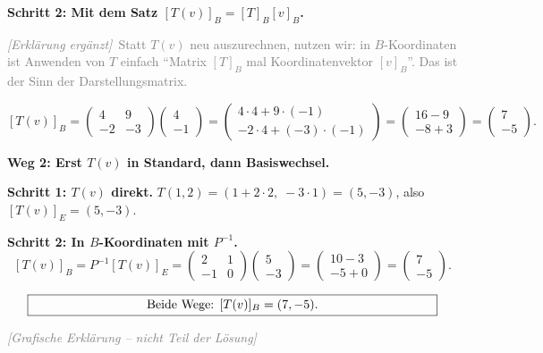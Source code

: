 \documentclass[a4paper,12pt]{article}
\newcommand{\grafik}{\textcolor{gray}{\small\textit{[Grafische Erkl\"arung -- nicht Teil der L\"osung]}}}
\newcommand{\erglerk}{\textcolor{gray}{\small\textit{[Erkl\"arung erg\"anzt]}}}
\begin{document}
\textbf{Schritt 2: Mit dem Satz $[T(v)]_B = [T]_B [v]_B$.}

\erglerk\ \textcolor{gray}{\small Statt $T(v)$ neu auszurechnen, nutzen wir: in $B$-Koordinaten ist Anwenden von $T$ einfach ``Matrix $[T]_B$ mal Koordinatenvektor $[v]_B$''. Das ist der Sinn der Darstellungsmatrix.}

\[
[T(v)]_B = \begin{pmatrix} 4 & 9 \\ -2 & -3 \end{pmatrix}\begin{pmatrix} 4 \\ -1 \end{pmatrix}
= \begin{pmatrix} 4\cdot 4 + 9\cdot(-1) \\ -2\cdot 4 + (-3)\cdot(-1) \end{pmatrix}
= \begin{pmatrix} 16 - 9 \\ -8 + 3 \end{pmatrix}
= \begin{pmatrix} 7 \\ -5 \end{pmatrix}.
\]

\bigskip

\textbf{Weg 2: Erst $T(v)$ in Standard, dann Basiswechsel.}

\textbf{Schritt 1: $T(v)$ direkt.} $T(1,2) = (1 + 2\cdot 2,\; -3\cdot 1) = (5, -3)$, also $[T(v)]_E = (5, -3)$.

\textbf{Schritt 2: In $B$-Koordinaten mit $P^{-1}$.}
\[
[T(v)]_B = P^{-1} [T(v)]_E = \begin{pmatrix} 2 & 1 \\ -1 & 0 \end{pmatrix}\begin{pmatrix} 5 \\ -3 \end{pmatrix}
= \begin{pmatrix} 10 - 3 \\ -5 + 0 \end{pmatrix}
= \begin{pmatrix} 7 \\ -5 \end{pmatrix}.
\]

\[
\fbox{\parbox{0.93\textwidth}{\centering
Beide Wege: $[T(v)]_B = (7, -5)$.
}}
\]

\grafik

\begin{center}
\end{center}
\end{document}
